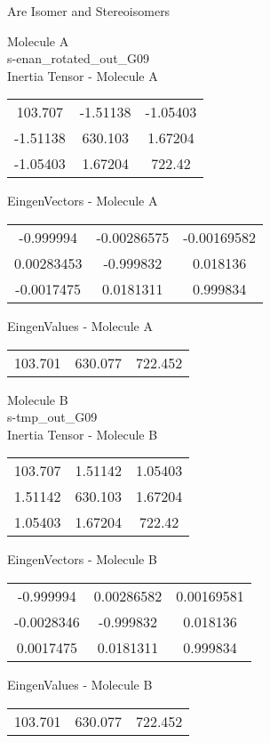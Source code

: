 \begin{center}
\vtab
\vtab
\textcolor{NavyBlue}{\Large Are Isomer and Stereoisomers}
\end{center}
\newpage
\begin{multicols}{2}
\begin{center}
Molecule A \\ 
s-enan\_rotated\_out\_G09
\\
Inertia Tensor - Molecule A \\
\vtab
\begin{tabular}{|c c c|}
103.707	 & 	-1.51138	 & 	-1.05403	 \\
-1.51138	 & 	630.103	 & 	1.67204	 \\
-1.05403	 & 	1.67204	 & 	722.42
\end{tabular}

\vtab
 EingenVectors - Molecule A     \\
\vtab
\begin{tabular}{|c c c|}
-0.999994	 & 	-0.00286575	 & 	-0.00169582	 \\
0.00283453	 & 	-0.999832	 & 	0.018136	 \\
-0.0017475	 & 	0.0181311	 & 	0.999834
\end{tabular}

\vtab
 EingenValues - Molecule A     \\
\vtab
\begin{tabular}{|c c c|}
103.701	 & 	630.077	 & 	722.452
\end{tabular}
\columnbreak

Molecule B \\ 
s-tmp\_out\_G09
\\
Inertia Tensor - Molecule B \\
\vtab
\begin{tabular}{|c c c|}
103.707	 & 	1.51142	 & 	1.05403	 \\
1.51142	 & 	630.103	 & 	1.67204	 \\
1.05403	 & 	1.67204	 & 	722.42
\end{tabular}

\vtab
 EingenVectors - Molecule B     \\
\vtab
\begin{tabular}{|c c c|}
-0.999994	 & 	0.00286582	 & 	0.00169581	 \\
-0.0028346	 & 	-0.999832	 & 	0.018136	 \\
0.0017475	 & 	0.0181311	 & 	0.999834
\end{tabular}

\vtab
 EingenValues - Molecule B     \\
\vtab
\begin{tabular}{|c c c|}
103.701	 & 	630.077	 & 	722.452
\end{tabular}

\end{center}
\end{multicols}
